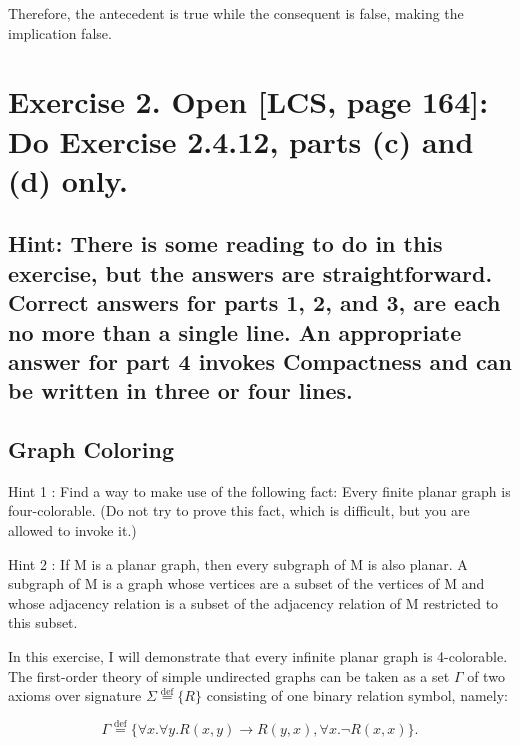 \documentclass{article}
\begin{document}
Therefore, the antecedent is true while the consequent is false, making the implication false.
\vspace{1em}


\newpage



\section*{Exercise 2. Open [LCS, page 164]: Do Exercise 2.4.12, parts (c) and (d) only.}

\subsection*{Hint: There is some reading to do in this exercise, but the answers are straightforward. Correct
answers for parts 1, 2, and 3, are each no more than a single line. An appropriate answer for part 4
invokes Compactness and can be written in three or four lines.}

\vspace{1em}

\begin{mdframed}
    \subsection*{Graph Coloring}

   Hint 1 : Find a way to make use of the following fact: Every ﬁnite planar graph is four-colorable.
    (Do not try to prove this fact, which is diﬃcult, but you are allowed to invoke it.)

    \vspace{1em}
    Hint 2 : If M is a planar graph, then every subgraph of M is also planar. A subgraph of M is a
    graph whose vertices are a subset of the vertices of M and whose adjacency relation is a subset
    of the adjacency relation of M restricted to this subset. 
  
\end{mdframed}

\vspace{1em}
In this exercise, I will demonstrate that every infinite planar graph is 4-colorable. The first-order theory of simple undirected graphs can be taken as a set $\Gamma$ of two axioms over signature $\Sigma \stackrel{\text{def}}{=} \{R\}$ consisting of one binary relation symbol, namely:

\[
\Gamma \stackrel{\text{def}}{=} \{\forall x.\forall y. R(x, y) \rightarrow R(y, x), \forall x. \neg R(x, x)\}.
\]
\end{document}

